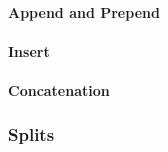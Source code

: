 \paragraph{Append and Prepend}

\paragraph{Insert}


\paragraph{Concatenation}



\subsubsection{Splits}



